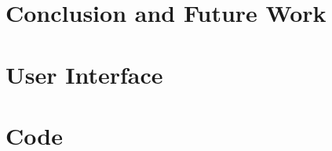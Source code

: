 \documentclass[12pt,twosided]{report}
\begin{document}
\chapter{Conclusion and Future Work}
\label{chap:outro}


\begin{appendices}


  
%

\chapter{User Interface}


\chapter{Code}

\end{appendices}

\printbibliography[heading=bibintoc,title={References}]
\end{document}
